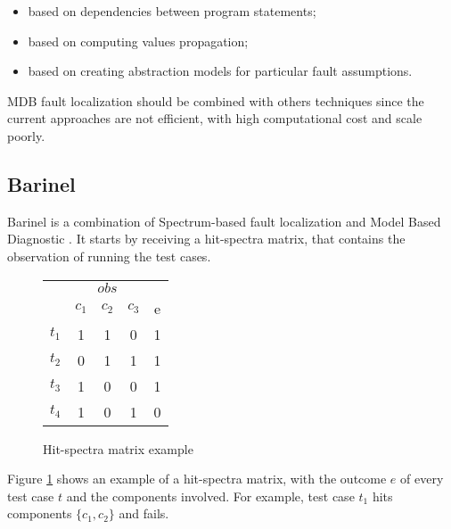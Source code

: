 \begin{itemize}
  \item based on dependencies between program statements;
  \item based on computing values propagation;
  \item based on creating abstraction models for particular fault assumptions.
\end{itemize}

MDB fault localization should be combined with others techniques since the current approaches are not efficient, with high computational cost and scale poorly.

\subsection{Barinel}
Barinel is a combination of Spectrum-based fault localization and Model Based Diagnostic \cite{Abreu:2009:SMF:1747491.1747511}. It starts by receiving a hit-spectra matrix, that contains the observation of running the test cases.

\newcommand{\pr}{\mbox{Pr}}
\newcommand{\likelihood}{\pr(obs_i, e_i \mid d)}
\newcommand{\gFunc}[1][d]{\displaystyle\prod_{j \in (d \cap obs_i)} g_j}


\begin{figure}[h]
\begin{center}
\begin{tabular}{c|ccc|c}
	& \multicolumn{3}{|c|}{$obs$} &      \\ 
  & $c_1$ & $c_2$ & $c_3$ & e     \\ \hline
  $t_1$ & 1     & 1     & 0     & 1     \\
  $t_2$ & 0     & 1     & 1     & 1     \\
  $t_3$ & 1     & 0     & 0     & 1     \\
  $t_4$ & 1     & 0     & 1     & 0     \\
\end{tabular}
\end{center}
\caption{Hit-spectra matrix example}
\label{figure:hit_spectra}
\end{figure}

Figure \ref{figure:hit_spectra} shows an example of a hit-spectra matrix, with the outcome $e$ of every test case $t$ and the components involved. For example, test case $t_1$ hits components $\{c_1, c_2\}$ and fails.


